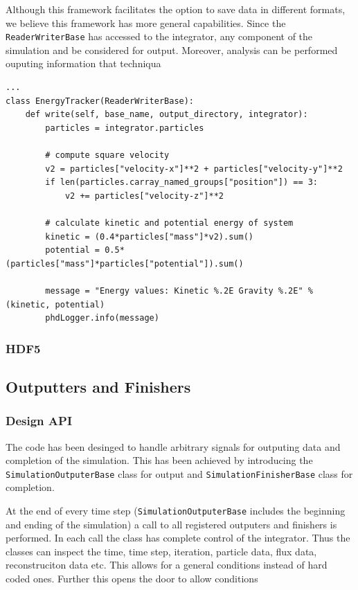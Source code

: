 Although this framework facilitates the option to save data in different formats,
we believe this framework has more general capabilities. Since the \lstinline{ReaderWriterBase}
has accessed to the integrator, any component of the simulation and be considered for
output. Moreover, analysis can be performed ouputing information that techniqua

\begin{lstlisting}
...
class EnergyTracker(ReaderWriterBase):
	def write(self, base_name, output_directory, integrator):
   		particles = integrator.particles
        
   		# compute square velocity
        v2 = particles["velocity-x"]**2 + particles["velocity-y"]**2
        if len(particles.carray_named_groups["position"]) == 3:
        	v2 += particles["velocity-z"]**2
            
        # calculate kinetic and potential energy of system    
        kinetic = (0.4*particles["mass"]*v2).sum()
        potential = 0.5*(particles["mass"]*particles["potential"]).sum()
        
        message = "Energy values: Kinetic %.2E Gravity %.2E" % (kinetic, potential)
        phdLogger.info(message)
\end{lstlisting}




\subsubsection{HDF5}

\subsection{Outputters and Finishers}
\label{sec.outputters}

\subsubsection{Design API}
The code has been desinged to handle arbitrary signals for outputing data
and completion of the simulation. This has been achieved by introducing the
\lstinline{SimulationOutputerBase} class for output and
\lstinline{SimulationFinisherBase} class for completion.

At the end of every
time step (\lstinline{SimulationOutputerBase} includes the beginning and ending
of the simulation) a call to all registered outputers and finishers is
performed. In each call the class has complete control of the integrator. Thus
the classes can inspect the time, time step, iteration, particle data, flux data,
reconstruciton data etc. This allows for a general conditions instead of hard
coded ones. Further this opens the door to allow conditions

